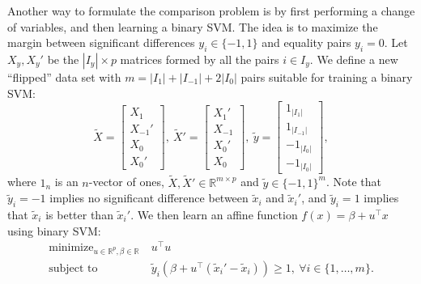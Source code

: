 \documentclass{article}
\newcommand{\RR}{\mathbb R}
\DeclareMathOperator*{\minimize}{minimize}
\begin{document}
Another way to formulate the comparison problem is by first performing
a change of variables, and then learning a binary SVM. The idea is to
maximize the margin between significant differences $y_i\in\{-1,1\}$
and equality pairs $y_i=0$. Let $X_y,X_y'$ be the $|I_y|\times p$
matrices formed by all the pairs $i\in I_y$. We define a new
``flipped'' data set with $m=|I_1|+|I_{-1}|+2|I_0|$ pairs suitable for
training a binary SVM:
\begin{equation}
\label{eq:tilde}
  \tilde X = \left[
    \begin{array}{c}
      X_1 \\
      X_{-1}'\\
      X_0\\
      X_0'
    \end{array}
  \right],\ 
  \tilde X' = \left[
    \begin{array}{c}
      X_1' \\
      X_{-1}\\
      X_0'\\
      X_0
    \end{array}
  \right],\ 
  \tilde y = \left[
    \begin{array}{c}
      1_{|I_1|} \\
      1_{|I_{-1}|}\\
      -1_{|I_0|}\\
      -1_{|I_0|}
    \end{array}
  \right],
\end{equation}
where $1_n$ is an $n$-vector of ones, $\tilde X,\tilde
X'\in\RR^{m\times p}$ and $\tilde y\in\{-1,1\}^m$. Note that $\tilde
y_i=-1$ implies no significant difference between $\tilde x_i$ and
$\tilde x_i'$, and $\tilde y_i=1$ implies that $\tilde x_i$ is better
than $\tilde x_i'$. We then learn an affine function
$f(x)=\beta+u^\intercal x$ using binary SVM:
\begin{equation}
  \label{eq:max-margin-qp-tilde}
  \begin{aligned}
    \minimize_{u\in\RR^p, \beta\in\RR}\ & u^\intercal u  \\
    \text{subject to}\ & 
    \tilde y_i (\beta + u^\intercal( \tilde x_i'-\tilde x_i) ) \geq 1,
    \ \forall i\in\{1,\dots,m\}.
  \end{aligned}
\end{equation}
\end{document}
